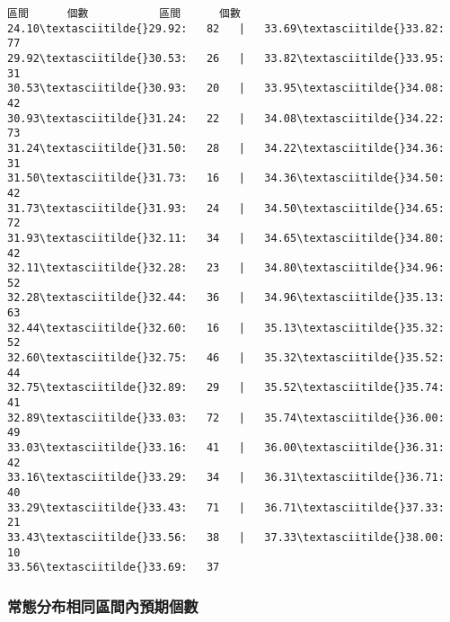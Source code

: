 \documentclass[11pt]{article}
\begin{document}
    \begin{Verbatim}[commandchars=\\\{\}]
    區間      個數           區間      個數
24.10\textasciitilde{}29.92:   82   |   33.69\textasciitilde{}33.82:   77
29.92\textasciitilde{}30.53:   26   |   33.82\textasciitilde{}33.95:   31
30.53\textasciitilde{}30.93:   20   |   33.95\textasciitilde{}34.08:   42
30.93\textasciitilde{}31.24:   22   |   34.08\textasciitilde{}34.22:   73
31.24\textasciitilde{}31.50:   28   |   34.22\textasciitilde{}34.36:   31
31.50\textasciitilde{}31.73:   16   |   34.36\textasciitilde{}34.50:   42
31.73\textasciitilde{}31.93:   24   |   34.50\textasciitilde{}34.65:   72
31.93\textasciitilde{}32.11:   34   |   34.65\textasciitilde{}34.80:   42
32.11\textasciitilde{}32.28:   23   |   34.80\textasciitilde{}34.96:   52
32.28\textasciitilde{}32.44:   36   |   34.96\textasciitilde{}35.13:   63
32.44\textasciitilde{}32.60:   16   |   35.13\textasciitilde{}35.32:   52
32.60\textasciitilde{}32.75:   46   |   35.32\textasciitilde{}35.52:   44
32.75\textasciitilde{}32.89:   29   |   35.52\textasciitilde{}35.74:   41
32.89\textasciitilde{}33.03:   72   |   35.74\textasciitilde{}36.00:   49
33.03\textasciitilde{}33.16:   41   |   36.00\textasciitilde{}36.31:   42
33.16\textasciitilde{}33.29:   34   |   36.31\textasciitilde{}36.71:   40
33.29\textasciitilde{}33.43:   71   |   36.71\textasciitilde{}37.33:   21
33.43\textasciitilde{}33.56:   38   |   37.33\textasciitilde{}38.00:   10
33.56\textasciitilde{}33.69:   37
    \end{Verbatim}

    \hypertarget{ux5e38ux614bux5206ux5e03ux76f8ux540cux5340ux9593ux5167ux9810ux671fux500bux6578}{%
\subsubsection{常態分布相同區間內預期個數}\label{ux5e38ux614bux5206ux5e03ux76f8ux540cux5340ux9593ux5167ux9810ux671fux500bux6578}}
\end{document}

